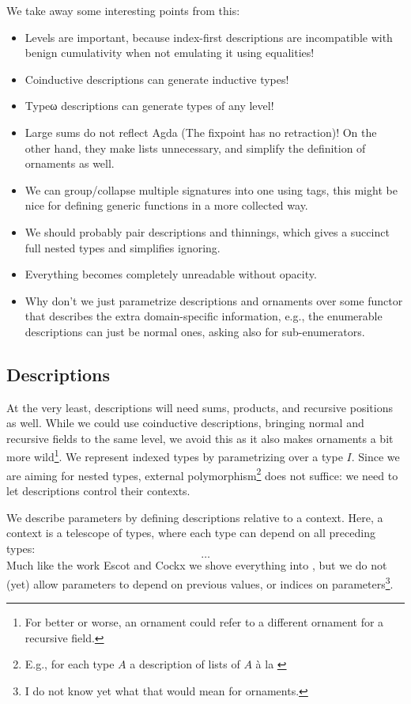 We take away some interesting points from this:
\begin{itemize}
    \item Levels are important, because index-first descriptions are incompatible with benign cumulativity when not emulating it using equalities! 
    \item Coinductive descriptions can generate inductive types!
    \item Typeω descriptions can generate types of any level!
    \item Large sums do not reflect Agda (The fixpoint has no retraction)! On the other hand, they make lists unnecessary, and simplify the definition of ornaments as well.
    \item We can group/collapse multiple signatures into one using tags, this might be nice for defining generic functions in a more collected way.
    \item We should probably pair descriptions and thinnings, which gives a succinct full nested types and simplifies ignoring.
    \item Everything becomes completely unreadable without opacity.
    \item Why don't we just parametrize descriptions and ornaments over some functor that describes the extra domain-specific information, e.g., the enumerable descriptions can just be normal ones, asking also for sub-enumerators. 
\end{itemize}


\subsection{Descriptions}
At the very least, descriptions will need sums, products, and recursive positions as well. While we could use coinductive descriptions, bringing normal and recursive fields to the same level, we avoid this as it also makes ornaments a bit more wild\footnote{For better or worse, an ornament could refer to a different ornament for a recursive field.}. We represent indexed types by parametrizing over a type $I$. Since we are aiming for nested types, external polymorphism\footnote{E.g., for each type $A$ a description of lists of $A$ à la \cite{progorn}} does not suffice: we need to let descriptions control their contexts.

We describe parameters by defining descriptions relative to a context. Here, a context is a telescope of types, where each type can depend on all preceding types:
\[ \dots \]
Much like the work Escot and Cockx \cite{practgen} we shove everything into , but we do not (yet) allow parameters to depend on previous values, or indices on parameters\footnote{I do not know yet what that would mean for ornaments.}.

